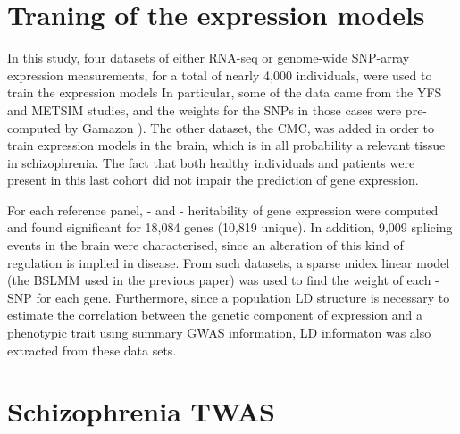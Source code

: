 \documentclass[../main.tex]{subfiles}
\begin{document}
\section{Traning of the expression models}

In this study, four datasets of either RNA-seq or genome-wide SNP-array 
expression measurements, for a total of nearly 4,000 individuals,  were 
used to train the expression models In particular, some 
of the data came from the YFS and METSIM studies, and the weights for 
the SNPs in those cases were pre-computed by Gamazon ). The 
other dataset, the CMC, was added in order to train expression models in 
the brain, which is in all probability a relevant tissue in 
schizophrenia. The fact that both healthy individuals and patients were 
present in this last cohort did not impair the prediction of gene 
expression.

For each reference panel, \cis- and \trans- heritability of gene 
expression were computed and found significant for 18,084 genes (10,819 
unique). In addition, 9,009 splicing events in the brain were 
characterised, since an alteration of this kind of regulation is implied 
in disease. From such datasets, a sparse midex linear model (the BSLMM 
used in the previous paper) was used to find the weight of each \cis-SNP 
for each gene. Furthermore, since a population LD structure is necessary 
to estimate the correlation between the genetic component of expression 
and a phenotypic trait using summary GWAS information, LD informaton was 
also extracted from these data sets.


\section{Schizophrenia TWAS}
\end{document}
